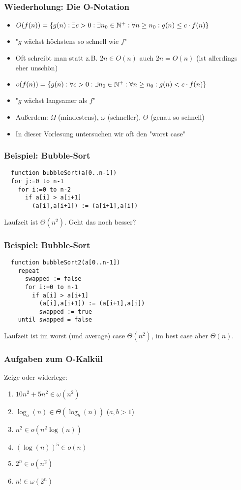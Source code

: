 \begin{frame}
\frametitle{Wiederholung: Die O-Notation}
\begin{itemize}
\item $O(f(n))=\{g(n):\exists c>0: \exists n_0\in\mathbb{N}^+: \forall n\geq n_0: g(n)\leq c\cdot f(n)\}$
\item "$g$ wächst höchstens so schnell wie $f$" \pause
\item Oft schreibt man statt z.B. $2n\in O(n)$ auch $2n=O(n)$ (ist allerdings eher unschön) \pause
\item $o(f(n))=\{g(n):\forall c>0: \exists n_0\in\mathbb{N}^+: \forall n\geq n_0: g(n)< c\cdot f(n)\}$
\item "$g$ wächst langsamer als $f$" \pause
\item Außerdem: $\Omega$ (mindestens), $\omega$ (schneller), $\Theta$ (genau so schnell) \pause
\item In dieser Vorlesung untersuchen wir oft den "worst case"
\end{itemize}
\end{frame}

\begin{frame}[fragile]
\frametitle{Beispiel: Bubble-Sort}
\begin{lstlisting}
  function bubbleSort(a[0..n-1])
  for j:=0 to n-1
    for i:=0 to n-2
      if a[i] > a[i+1]
        (a[i],a[i+1]) := (a[i+1],a[i]) 
\end{lstlisting}\pause
Laufzeit ist $\Theta(n^2)$. Geht das noch besser?
\end{frame}

\begin{frame}[fragile]
\frametitle{Beispiel: Bubble-Sort}
\begin{lstlisting}
  function bubbleSort2(a[0..n-1])
    repeat
      swapped := false
      for i:=0 to n-1
        if a[i] > a[i+1]
          (a[i],a[i+1]) := (a[i+1],a[i]) 
          swapped := true
    until swapped = false
\end{lstlisting}\pause
Laufzeit ist im worst (und average) case $\Theta(n^2)$, im best case aber $\Theta(n)$.
\end{frame}

\begin{frame}
\frametitle{Aufgaben zum O-Kalkül}
Zeige oder widerlege:
\begin{enumerate}
\item $10n^2 + 5n^2 \in \omega(n^2)$
\item $\log_a(n)\in\Theta(\log_b(n))$ ($a,b>1$)
\item $n^2 \in o(n^2 \log(n))$
\item $(\log(n))^5 \in o(n)$
\item $2^n \in o(n^2)$
\item $n! \in \omega(2^n)$
\end{enumerate}
\end{frame}

